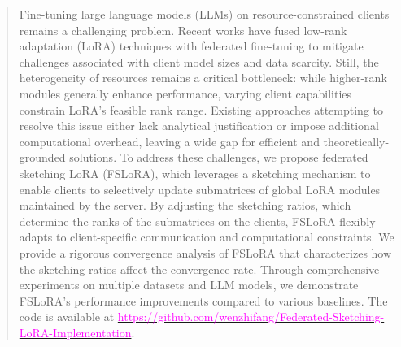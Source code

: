 \documentclass{article} %
\theoremstyle{plain}
\theoremstyle{definition}
\begin{document}
\begin{abstract}
Fine-tuning large language models (LLMs) on resource-constrained clients remains a challenging problem.
Recent works have fused low-rank adaptation (LoRA) techniques with federated fine-tuning to mitigate challenges associated with client model sizes and data scarcity. Still, the heterogeneity of resources remains a critical bottleneck: while higher-rank modules generally enhance performance, varying client capabilities constrain LoRA's feasible rank range.
Existing approaches attempting to resolve this issue either lack analytical justification or impose additional computational overhead, leaving a wide gap for efficient and theoretically-grounded solutions.
To address these challenges, we propose federated sketching LoRA (FSLoRA), which leverages a sketching mechanism to enable clients to selectively update submatrices of global LoRA modules maintained by the server. By adjusting the sketching ratios, which determine the ranks of the submatrices on the clients, FSLoRA flexibly adapts to client-specific communication and computational constraints.
We provide a rigorous convergence analysis of FSLoRA that characterizes how the sketching ratios affect the convergence rate. 
Through comprehensive experiments on multiple datasets and LLM models, we demonstrate FSLoRA's performance improvements compared to various baselines. The code is available at \href{https://github.com/wenzhifang/Federated-Sketching-LoRA-Implementation}{\textcolor{magenta}{https://github.com/wenzhifang/Federated-Sketching-LoRA-Implementation}}.



\end{abstract}

\end{document}
